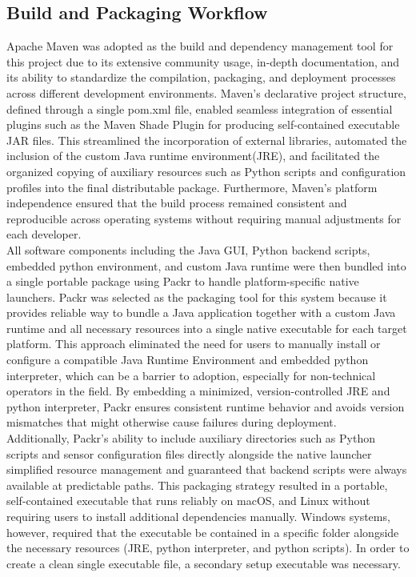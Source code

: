 \documentclass{article}
\begin{document}
\subsection{Build and Packaging Workflow}
Apache Maven was adopted as the build and dependency management tool for this project due to its extensive community usage, in-depth documentation, and its ability to standardize the compilation, packaging, and deployment processes across different development environments. Maven’s declarative project structure, defined through a single pom.xml file, enabled seamless integration of essential plugins such as the Maven Shade Plugin for producing self-contained executable JAR files. This streamlined the incorporation of external libraries, automated the inclusion of the custom Java runtime environment(JRE), and facilitated the organized copying of auxiliary resources such as Python scripts and configuration profiles into the final distributable package. Furthermore, Maven’s platform independence ensured that the build process remained consistent and reproducible across operating systems without requiring manual adjustments for each developer.\\

All software components including the Java GUI, Python backend scripts, embedded python environment, and custom Java runtime were then bundled into a single portable package using Packr to handle platform-specific native launchers. Packr was selected as the packaging tool for this system because it provides reliable way to bundle a Java application together with a custom Java runtime and all necessary resources into a single native executable for each target platform. This approach eliminated the need for users to manually install or configure a compatible Java Runtime Environment and embedded python interpreter, which can be a barrier to adoption, especially for non-technical operators in the field. By embedding a minimized, version-controlled JRE and python interpreter, Packr ensures consistent runtime behavior and avoids version mismatches that might otherwise cause failures during deployment. \\

Additionally, Packr’s ability to include auxiliary directories such as Python scripts and sensor configuration files directly alongside the native launcher simplified resource management and guaranteed that backend scripts were always available at predictable paths. This packaging strategy resulted in a portable, self-contained executable that runs reliably on macOS, and Linux without requiring users to install additional dependencies manually. Windows systems, however, required that the executable be contained in a specific folder alongside the necessary resources (JRE, python interpreter, and python scripts). In order to create a clean single executable file, a secondary setup executable was necessary.\\
\end{document}
